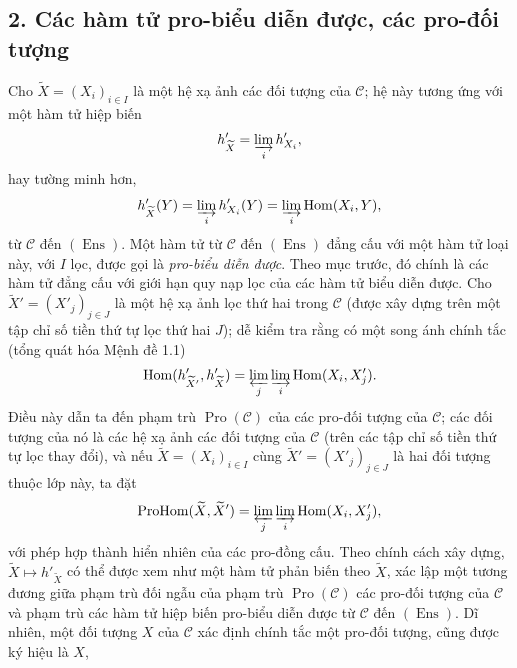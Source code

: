 \subsection*{2. Các hàm tử pro-biểu diễn được, các pro-đối tượng}

Cho $\widetilde X=(X_i)_{i\in I}$ là một hệ xạ ảnh các đối tượng của
$\mathcal C$; hệ này tương ứng với một hàm tử hiệp biến
\[
  h'_{\widetilde X}=\varinjlim_i h'_{X_i},
\]
hay tường minh hơn,
\[
  h'_{\widetilde X}(Y)=\varinjlim_i h'_{X_i}(Y)
  =\varinjlim_i\operatorname{Hom}(X_i,Y),
\]
từ $\mathcal C$ đến $(\operatorname{Ens})$. Một hàm tử từ $\mathcal C$ đến
$(\operatorname{Ens})$ đẳng cấu với một hàm tử loại này, với $I$ lọc, được
gọi là \emph{pro-biểu diễn được}. Theo mục trước, đó chính là các hàm tử đẳng
cấu với giới hạn quy nạp lọc của các hàm tử biểu diễn được. Cho
$\widetilde X'=(X'_j)_{j\in J}$ là một hệ xạ ảnh lọc thứ hai trong
$\mathcal C$ (được xây dựng trên một tập chỉ số tiền thứ tự lọc thứ hai
$J$); dễ kiểm tra rằng có một song ánh chính tắc (tổng quát hóa Mệnh đề 1.1)
\[
  \operatorname{Hom}(h'_{\widetilde X'},h'_{\widetilde X})
  =\varprojlim_j\varinjlim_i\operatorname{Hom}(X_i,X'_j).
\]
Điều này dẫn ta đến phạm trù $\operatorname{Pro}(\mathcal C)$ của các
pro-đối tượng của $\mathcal C$; các đối tượng của nó là các hệ xạ ảnh các đối
tượng của $\mathcal C$ (trên các tập chỉ số tiền thứ tự lọc thay đổi), và nếu
$\widetilde X=(X_i)_{i\in I}$ cùng
$\widetilde X'=(X'_j)_{j\in J}$ là hai đối tượng thuộc lớp này, ta đặt
\[
  \operatorname{ProHom}(\widetilde X,\widetilde X')
  =\varprojlim_j\varinjlim_i\operatorname{Hom}(X_i,X'_j),
\]
với phép hợp thành hiển nhiên của các pro-đồng cấu. Theo chính cách xây dựng,
$\widetilde X\longmapsto h'_{\widetilde X}$ có thể được xem như một hàm tử
phản biến theo $\widetilde X$, xác lập một tương đương giữa phạm trù đối ngẫu
của phạm trù $\operatorname{Pro}(\mathcal C)$ các pro-đối tượng của
$\mathcal C$ và phạm trù các hàm tử hiệp biến pro-biểu diễn được từ
$\mathcal C$ đến $(\operatorname{Ens})$. Dĩ nhiên, một đối tượng $X$ của
$\mathcal C$ xác định chính tắc một pro-đối tượng, cũng được ký hiệu là $X$,

